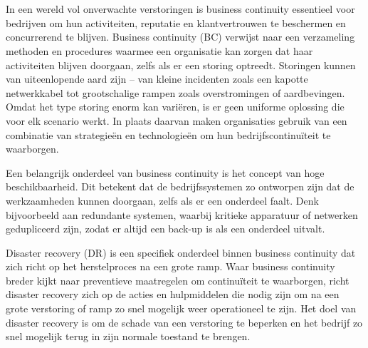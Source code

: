 \chapter{}%
\label{ch:literatuurstudie}


In een wereld vol onverwachte verstoringen is business continuity essentieel voor bedrijven om hun activiteiten, reputatie en klantvertrouwen te beschermen en concurrerend te blijven. Business continuity (BC) verwijst naar een verzameling methoden en procedures waarmee een organisatie kan zorgen dat haar activiteiten blijven doorgaan, zelfs als er een storing optreedt. Storingen kunnen van uiteenlopende aard zijn – van kleine incidenten zoals een kapotte netwerkkabel tot grootschalige rampen zoals overstromingen of aardbevingen. Omdat het type storing enorm kan variëren, is er geen uniforme oplossing die voor elk scenario werkt. In plaats daarvan maken organisaties gebruik van een combinatie van strategieën en technologieën om hun bedrijfscontinuïteit te waarborgen. \autocite{Zhu2015}

Een belangrijk onderdeel van business continuity is het concept van hoge beschikbaarheid. Dit betekent dat de bedrijfssystemen zo ontworpen zijn dat de werkzaamheden kunnen doorgaan, zelfs als er een onderdeel faalt. Denk bijvoorbeeld aan redundante systemen, waarbij kritieke apparatuur of netwerken gedupliceerd zijn, zodat er altijd een back-up is als een onderdeel uitvalt.

Disaster recovery (DR) is een specifiek onderdeel binnen business continuity dat zich richt op het herstelproces na een grote ramp. Waar business continuity breder kijkt naar preventieve maatregelen om continuïteit te waarborgen, richt disaster recovery zich op de acties en hulpmiddelen die nodig zijn om na een grote verstoring of ramp zo snel mogelijk weer operationeel te zijn. Het doel van disaster recovery is om de schade van een verstoring te beperken en het bedrijf zo snel mogelijk terug in zijn normale toestand te brengen.